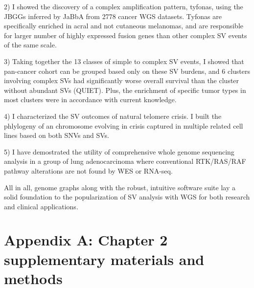 \documentclass[phd,tocprelim]{cornell}
\begin{document}
2) I showed the discovery of a complex amplification pattern, tyfonas, using the JBGGs inferred by JaBbA from 2778 cancer WGS datasets. Tyfonas are specifically enriched in acral and not cutaneous melanomas, and are responsible for larger number of highly expressed fusion genes than other complex SV events of the same scale.

3) Taking together the 13 classes of simple to complex SV events, I showed that pan-cancer cohort can be grouped based only on these SV burdens, and 6 clusters involving complex SVs had significantly worse overall survival than the cluster without abundant SVs (QUIET). Plus, the enrichment of specific tumor types in most clusters were in accordance with current knowledge. 

4) I characterized the SV outcomes of natural telomere crisis. I built the phlylogeny of an chromosome evolving in crisis captured in multiple related cell lines based on both SNVs and SVs.

5) I have demostrated the utility of comprehensive whole genome sequencing analysis in a group of lung adenocarcinoma where conventional RTK/RAS/RAF pathway alterations are not found by WES or RNA-seq.

All in all, genome graphs along with the robust, intuitive software suite lay a solid foundation to the popularization of SV analysis with WGS for both research and clinical applications.

\appendix

\chapter*{Appendix A: Chapter 2 supplementary materials and methods} \label{app:a}
\end{document}

